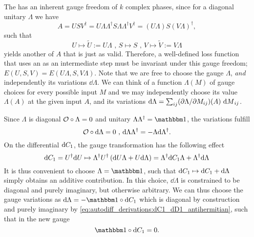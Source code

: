 The  has an inherent gauge freedom of $k$ complex phases, since for a diagonal unitary $\Lambda$ we have
\begin{equation}
    A 
    = USV^{\dagger} 
    = U\Lambda\Lambda^{\dagger} S \Lambda\Lambda^{\dagger} V^{\dagger} 
    = (U\Lambda)S(V\Lambda)^{\dagger}
    ,
\end{equation}
such that
\begin{equation}
    U \mapsto \tilde U := U\Lambda
    \text{ , }
    S \mapsto S
    \text{ , }
    V \mapsto \tilde V := V\Lambda
\end{equation}
yields another  of $A$ that is just as valid.
Therefore, a well-defined loss function that uses an  as an intermediate step must be invariant under this gauge freedom; $E(U, S, V) = E(U\Lambda, S, V\Lambda)$.
%
Note that we are free to choose the gauge $\Lambda$, \emph{and} independently its variations $\dd\Lambda$.
%
We can think of a function $\Lambda(M)$ of gauge choices for every possible input $M$ and we may independently choose its value $\Lambda(A)$ at the given input $A$, and its variations $\mathrm{d}\Lambda = \sum_{ij} (\partial \Lambda / \partial M_{ij})(A)~\,\! \mathrm{d} {M} \,\!_{ij}$.

Since $\Lambda$ is diagonal $\mathcal{O}\circ\Lambda = 0$ and unitary $\Lambda\Lambda^{\dagger} = \eye$, the variations fulfill
\begin{equation}
    \mathcal{O}\circ\mathrm{d}\Lambda = 0
    \text{ , }
    \mathrm{d}\Lambda\Lambda^{\dagger} = - \Lambda\mathrm{d}\Lambda^{\dagger}
    .
\end{equation}
On the differential $\mathrm{d}{C}_1$, the gauge transformation has the following effect
\begin{equation}
    \dC_1
    = U^\dagger \dU
    \mapsto \Lambda^\dagger U^\dagger \rBr{\dU \Lambda + U \dd\Lambda}
    = \Lambda^\dagger \dC_1 \Lambda + \Lambda^\dagger \d{\Lambda}
\end{equation}
%
It is thus convenient to choose $\Lambda = \eye$, such that $\mathrm{d}{C}_1 \mapsto \mathrm{d}{C}_1 + \mathrm{d}\Lambda$ simply obtains an additive contribution.
%
In this choice, $\dd\Lambda$ is constrained to be diagonal and purely imaginary, but otherwise arbitrary.
%
We can thus choose the gauge variations as $\dd\Lambda = -\eye\hadamard\dC_1$ which is diagonal by construction and purely imaginary by \eqref{eq:autodiff_derivations:dC1_dD1_antihermitian}, such that in the new gauge
\begin{equation}
    \eye\hadamard\dC_1 = 0
    .
    \label{eq:autodiff_derivations:diag_dC1_from_gauge}
\end{equation}


